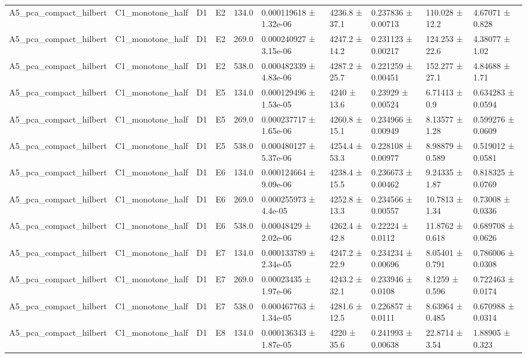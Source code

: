 \begin{table}
\begin{tabular}{llllllllll}
A5\_pca\_compact\_hilbert & C1\_monotone\_half & D1 & E2 & 134.0 & 0.000119618 ± 1.32e-06 & 4236.8 ± 37.1 & 0.237836 ± 0.00713 & 110.028 ± 12.2 & 4.67071 ± 0.828 \\
A5\_pca\_compact\_hilbert & C1\_monotone\_half & D1 & E2 & 269.0 & 0.000240927 ± 3.15e-06 & 4247.2 ± 14.2 & 0.231123 ± 0.00217 & 124.253 ± 22.6 & 4.38077 ± 1.02 \\
A5\_pca\_compact\_hilbert & C1\_monotone\_half & D1 & E2 & 538.0 & 0.000482339 ± 4.83e-06 & 4287.2 ± 25.7 & 0.221259 ± 0.00451 & 152.277 ± 27.1 & 4.84688 ± 1.71 \\
A5\_pca\_compact\_hilbert & C1\_monotone\_half & D1 & E5 & 134.0 & 0.000129496 ± 1.53e-05 & 4240 ± 13.6 & 0.23929 ± 0.00524 & 6.71413 ± 0.9 & 0.634283 ± 0.0594 \\
A5\_pca\_compact\_hilbert & C1\_monotone\_half & D1 & E5 & 269.0 & 0.000237717 ± 1.65e-06 & 4260.8 ± 15.1 & 0.234966 ± 0.00949 & 8.13577 ± 1.28 & 0.599276 ± 0.0609 \\
A5\_pca\_compact\_hilbert & C1\_monotone\_half & D1 & E5 & 538.0 & 0.000480127 ± 5.37e-06 & 4254.4 ± 53.3 & 0.228108 ± 0.00977 & 8.98879 ± 0.589 & 0.519012 ± 0.0581 \\
A5\_pca\_compact\_hilbert & C1\_monotone\_half & D1 & E6 & 134.0 & 0.000124664 ± 9.09e-06 & 4238.4 ± 15.5 & 0.236673 ± 0.00462 & 9.24335 ± 1.87 & 0.818325 ± 0.0769 \\
A5\_pca\_compact\_hilbert & C1\_monotone\_half & D1 & E6 & 269.0 & 0.000255973 ± 4.4e-05 & 4252.8 ± 13.3 & 0.234566 ± 0.00557 & 10.7813 ± 1.34 & 0.73008 ± 0.0336 \\
A5\_pca\_compact\_hilbert & C1\_monotone\_half & D1 & E6 & 538.0 & 0.00048429 ± 2.02e-06 & 4262.4 ± 42.8 & 0.22224 ± 0.0112 & 11.8762 ± 0.618 & 0.689708 ± 0.0626 \\
A5\_pca\_compact\_hilbert & C1\_monotone\_half & D1 & E7 & 134.0 & 0.000133789 ± 2.34e-05 & 4247.2 ± 22.9 & 0.234234 ± 0.00696 & 8.05401 ± 0.791 & 0.786006 ± 0.0308 \\
A5\_pca\_compact\_hilbert & C1\_monotone\_half & D1 & E7 & 269.0 & 0.00023435 ± 1.97e-06 & 4243.2 ± 32.1 & 0.233946 ± 0.0108 & 8.1259 ± 0.596 & 0.722463 ± 0.0174 \\
A5\_pca\_compact\_hilbert & C1\_monotone\_half & D1 & E7 & 538.0 & 0.000467763 ± 1.34e-05 & 4281.6 ± 12.5 & 0.226857 ± 0.0111 & 8.63964 ± 0.485 & 0.670988 ± 0.0314 \\
A5\_pca\_compact\_hilbert & C1\_monotone\_half & D1 & E8 & 134.0 & 0.000136343 ± 1.87e-05 & 4220 ± 35.6 & 0.241993 ± 0.00638 & 22.8714 ± 3.54 & 1.88905 ± 0.323 \\

\end{tabular}
\end{table}
